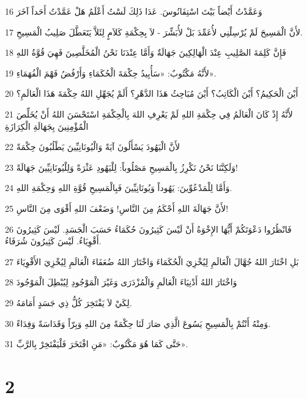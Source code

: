 \par 16 وَعَمَّدْتُ أَيْضاً بَيْتَ اسْتِفَانُوسَ. عَدَا ذَلِكَ لَسْتُ أَعْلَمُ هَلْ عَمَّدْتُ أَحَداً آخَرَ
\par 17 لأَنَّ الْمَسِيحَ لَمْ يُرْسِلْنِي لأُعَمِّدَ بَلْ لأُبَشِّرَ - لاَ بِحِكْمَةِ كَلاَمٍ لِئَلاَّ يَتَعَطَّلَ صَلِيبُ الْمَسِيحِ.
\par 18 فَإِنَّ كَلِمَةَ الصَّلِيبِ عِنْدَ الْهَالِكِينَ جَهَالَةٌ وَأَمَّا عِنْدَنَا نَحْنُ الْمُخَلَّصِينَ فَهِيَ قُوَّةُ اللهِ
\par 19 لأَنَّهُ مَكْتُوبٌ: «سَأُبِيدُ حِكْمَةَ الْحُكَمَاءِ وَأَرْفُضُ فَهْمَ الْفُهَمَاءِ».
\par 20 أَيْنَ الْحَكِيمُ؟ أَيْنَ الْكَاتِبُ؟ أَيْنَ مُبَاحِثُ هَذَا الدَّهْرِ؟ أَلَمْ يُجَهِّلِ اللهُ حِكْمَةَ هَذَا الْعَالَمِ؟
\par 21 لأَنَّهُ إِذْ كَانَ الْعَالَمُ فِي حِكْمَةِ اللهِ لَمْ يَعْرِفِ اللهَ بِالْحِكْمَةِ اسْتَحْسَنَ اللهُ أَنْ يُخَلِّصَ الْمُؤْمِنِينَ بِجَهَالَةِ الْكِرَازَةِ
\par 22 لأَنَّ الْيَهُودَ يَسْأَلُونَ آيَةً وَالْيُونَانِيِّينَ يَطْلُبُونَ حِكْمَةً
\par 23 وَلَكِنَّنَا نَحْنُ نَكْرِزُ بِالْمَسِيحِ مَصْلُوباً: لِلْيَهُودِ عَثْرَةً وَلِلْيُونَانِيِّينَ جَهَالَةً!
\par 24 وَأَمَّا لِلْمَدْعُوِّينَ: يَهُوداً وَيُونَانِيِّينَ فَبِالْمَسِيحِ قُوَّةِ اللهِ وَحِكْمَةِ اللهِ.
\par 25 لأَنَّ جَهَالَةَ اللهِ أَحْكَمُ مِنَ النَّاسِ! وَضَعْفَ اللهِ أَقْوَى مِنَ النَّاسِ!
\par 26 فَانْظُرُوا دَعْوَتَكُمْ أَيُّهَا الإِخْوَةُ أَنْ لَيْسَ كَثِيرُونَ حُكَمَاءُ حَسَبَ الْجَسَدِ. لَيْسَ كَثِيرُونَ أَقْوِيَاءُ. لَيْسَ كَثِيرُونَ شُرَفَاءُ.
\par 27 بَلِ اخْتَارَ اللهُ جُهَّالَ الْعَالَمِ لِيُخْزِيَ الْحُكَمَاءَ وَاخْتَارَ اللهُ ضُعَفَاءَ الْعَالَمِ لِيُخْزِيَ الأَقْوِيَاءَ
\par 28 وَاخْتَارَ اللهُ أَدْنِيَاءَ الْعَالَمِ وَالْمُزْدَرَى وَغَيْرَ الْمَوْجُودِ لِيُبْطِلَ الْمَوْجُودَ
\par 29 لِكَيْ لاَ يَفْتَخِرَ كُلُّ ذِي جَسَدٍ أَمَامَهُ.
\par 30 وَمِنْهُ أَنْتُمْ بِالْمَسِيحِ يَسُوعَ الَّذِي صَارَ لَنَا حِكْمَةً مِنَ اللهِ وَبِرّاً وَقَدَاسَةً وَفِدَاءً.
\par 31 حَتَّى كَمَا هُوَ مَكْتُوبٌ: «مَنِ افْتَخَرَ فَلْيَفْتَخِرْ بِالرَّبِّ».

\chapter{2}

